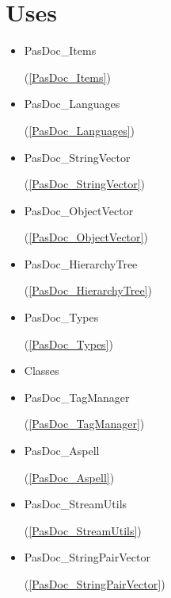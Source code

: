 \documentclass{report}
\begin{document}
\section{Uses}
\begin{itemize}
\item \begin{ttfamily}PasDoc{\_}Items\end{ttfamily}(\ref{PasDoc_Items})\item \begin{ttfamily}PasDoc{\_}Languages\end{ttfamily}(\ref{PasDoc_Languages})\item \begin{ttfamily}PasDoc{\_}StringVector\end{ttfamily}(\ref{PasDoc_StringVector})\item \begin{ttfamily}PasDoc{\_}ObjectVector\end{ttfamily}(\ref{PasDoc_ObjectVector})\item \begin{ttfamily}PasDoc{\_}HierarchyTree\end{ttfamily}(\ref{PasDoc_HierarchyTree})\item \begin{ttfamily}PasDoc{\_}Types\end{ttfamily}(\ref{PasDoc_Types})\item \begin{ttfamily}Classes\end{ttfamily}\item \begin{ttfamily}PasDoc{\_}TagManager\end{ttfamily}(\ref{PasDoc_TagManager})\item \begin{ttfamily}PasDoc{\_}Aspell\end{ttfamily}(\ref{PasDoc_Aspell})\item \begin{ttfamily}PasDoc{\_}StreamUtils\end{ttfamily}(\ref{PasDoc_StreamUtils})\item \begin{ttfamily}PasDoc{\_}StringPairVector\end{ttfamily}(\ref{PasDoc_StringPairVector})\end{itemize}
\end{document}
